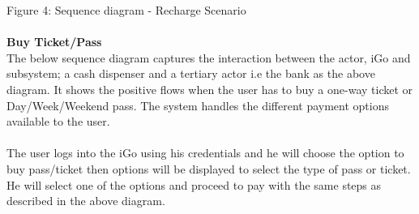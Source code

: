 \documentclass[a4paper, 11pt]{report}
\begin{document}
{\tab\tab\qquad\qquad\qquad\qquad
Figure 4: Sequence diagram - Recharge Scenario \\\\
\large{\textbf{Buy Ticket/Pass}}\\
The below sequence diagram captures the interaction between the actor, iGo and subsystem; a cash dispenser and a tertiary actor i.e the bank as the above diagram. It shows the positive flows when the user has to buy a one-way ticket or Day/Week/Weekend pass. The system handles the different payment options available to the user.\\\\
The user logs into the iGo using his credentials and he will choose the option to buy pass/ticket then options will be displayed to select the type of pass or ticket. He will select one of the options and proceed to pay with the same steps as described in the above diagram.

}
\end{document}
